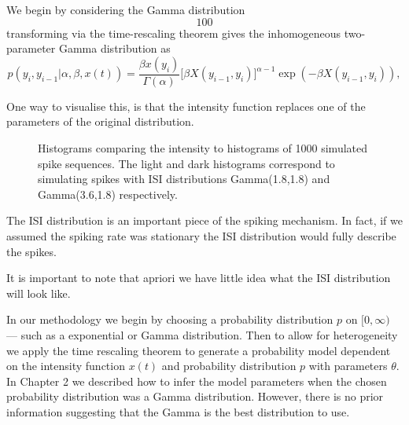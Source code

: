 \documentclass[../main.tex]{subfiles}
\begin{document}
We begin by considering the Gamma distribution 
$$ 100$$ 
transforming via the time-rescaling theorem gives the inhomogeneous two-parameter Gamma distribution as 
\begin{equation*}
 p(y_i, y_{i-1}| \alpha, \beta, x(t)) =  \frac{\beta x(y_i)}{\Gamma ( \alpha )} \big[ \beta X(y_{i-1} , y_i ) \big]^{\alpha -1} \exp( - \beta X(y_{i-1} , y_i )  ),
 \end{equation*}
 
 One way to visualise this, is that the intensity function replaces one of the parameters of the original distribution. 

	
  \begin{figure}[t]
   \hrulefill
   \begin{center} 
    \end{center}     
    \caption{Histograms comparing the intensity to histograms of 1000 simulated spike sequences. The light and dark histograms correspond to simulating spikes with ISI distributions Gamma(1.8,1.8) and Gamma(3.6,1.8) respectively.  }
    \label{fig:CompareHist}
    \hrulefill
    \end{figure}
    













The ISI distribution is an important piece of the  spiking mechanism. In fact, if we assumed the spiking rate was stationary the ISI distribution would fully describe the  spikes. 

It is important to note that apriori we have little idea what the ISI distribution will look like. 








In our methodology we begin by choosing a probability distribution $p$ on $[0,\infty )$ --- such as a exponential or Gamma distribution. Then to allow for heterogeneity we apply the time rescaling theorem to generate a probability model dependent on the intensity function $x(t)$ and probability distribution $p$ with parameters $\theta$. In Chapter 2 we described how to infer the model parameters when the chosen probability distribution was a Gamma distribution. However, there is no prior information suggesting that the Gamma is the best distribution to use. 
\end{document}
